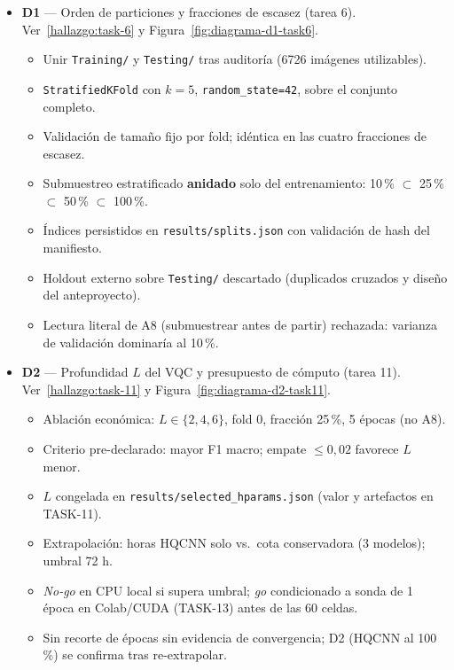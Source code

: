 \documentclass[12pt,letterpaper]{article}
\begin{document}
\begin{itemize}
    \item \textbf{D1} --- Orden de particiones y fracciones de escasez (tarea 6).
    Ver~\ref{hallazgo:task-6} y Figura~\ref{fig:diagrama-d1-task6}.
    \begin{itemize}
        \item Unir \texttt{Training/} y \texttt{Testing/} tras auditoría (6726 imágenes utilizables).
        \item \texttt{StratifiedKFold} con $k=5$, \texttt{random\_state=42}, sobre el conjunto completo.
        \item Validación de tamaño fijo por fold; idéntica en las cuatro fracciones de escasez.
        \item Submuestreo estratificado \textbf{anidado} solo del entrenamiento: 10\,\% $\subset$ 25\,\% $\subset$ 50\,\% $\subset$ 100\,\%.
        \item Índices persistidos en \texttt{results/splits.json} con validación de hash del manifiesto.
        \item Holdout externo sobre \texttt{Testing/} descartado (duplicados cruzados y diseño del anteproyecto).
        \item Lectura literal de A8 (submuestrear antes de partir) rechazada: varianza de validación dominaría al 10\,\%.
    \end{itemize}
    \item \textbf{D2} --- Profundidad $L$ del VQC y presupuesto de cómputo (tarea 11).
    Ver~\ref{hallazgo:task-11} y Figura~\ref{fig:diagrama-d2-task11}.
    \begin{itemize}
        \item Ablación económica: $L \in \{2,4,6\}$, fold 0, fracción 25\,\%, 5 épocas (no A8).
        \item Criterio pre-declarado: mayor F1 macro; empate $\leq 0{,}02$ favorece $L$ menor.
        \item $L$ congelada en \texttt{results/selected\_hparams.json} (valor y artefactos en TASK-11).
        \item Extrapolación: horas HQCNN solo vs.\ cota conservadora ($3$ modelos); umbral 72 h.
        \item \textit{No-go} en CPU local si supera umbral; \textit{go} condicionado a sonda de 1 época
              en Colab/CUDA (TASK-13) antes de las 60 celdas.
        \item Sin recorte de épocas sin evidencia de convergencia; D2 (HQCNN al 100\,\%) se confirma tras re-extrapolar.

\end{itemize}
\end{itemize}
\end{document}
